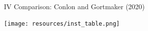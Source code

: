 


\begin{frame}{IV Comparison: Conlon and Gortmaker (2020)}
\begin{center}
\texttt{[image: resources/inst\_table.png]}
\end{center}
\end{frame}

